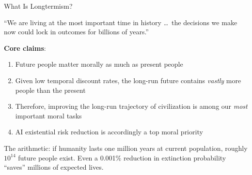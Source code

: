 \documentclass[aspectratio=169,11pt]{beamer}
\begin{document}
\begin{frame}[shrink=17]{What Is Longtermism?}
\begin{conceptbox}
``We are living at the most important time in history \ldots\ the decisions we make now could lock in outcomes for billions of years.''

\vspace{0.15cm}
\textbf{Core claims}:
\begin{enumerate}
    \item Future people matter morally as much as present people
    \item Given low temporal discount rates, the long-run future contains \emph{vastly} more people than the present
    \item Therefore, improving the long-run trajectory of civilization is among our \emph{most} important moral tasks
    \item AI existential risk reduction is accordingly a top moral priority
\end{enumerate}
\vspace{0.1cm}
\scriptsize\textcite{macaskill_future_2022}
\end{conceptbox}

\vspace{0.2cm}
The arithmetic: if humanity lasts one million years at current population, roughly $10^{14}$ future people exist. Even a 0.001\% reduction in extinction probability ``saves'' millions of expected lives.
\end{frame}
\end{document}
